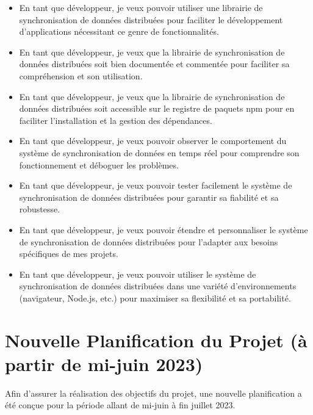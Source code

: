 \begin{itemize}
    \item En tant que développeur, je veux pouvoir utiliser une librairie de synchronisation de données distribuées pour faciliter le développement d'applications nécessitant ce genre de fonctionnalités.
    \item En tant que développeur, je veux que la librairie de synchronisation de données distribuées soit bien documentée et commentée pour faciliter sa compréhension et son utilisation.
    \item En tant que développeur, je veux que la librairie de synchronisation de données distribuées soit accessible sur le registre de paquets \gls{npm} pour en faciliter l'installation et la gestion des dépendances.
    \item En tant que développeur, je veux pouvoir observer le comportement du système de synchronisation de données en temps réel pour comprendre son fonctionnement et déboguer les problèmes.
    \item En tant que développeur, je veux pouvoir tester facilement le système de synchronisation de données distribuées pour garantir sa fiabilité et sa robustesse.
    \item En tant que développeur, je veux pouvoir étendre et personnaliser le système de synchronisation de données distribuées pour l'adapter aux besoins spécifiques de mes projets.
    \item En tant que développeur, je veux pouvoir utiliser le système de synchronisation de données distribuées dans une variété d'environnements (navigateur, \gls{Node.js}, etc.) pour maximiser sa flexibilité et sa portabilité.
\end{itemize}

\section*{Nouvelle Planification du Projet (à partir de mi-juin 2023)}

Afin d'assurer la réalisation des objectifs du projet, une nouvelle
planification a été conçue pour la période allant de mi-juin à fin juillet 2023.

